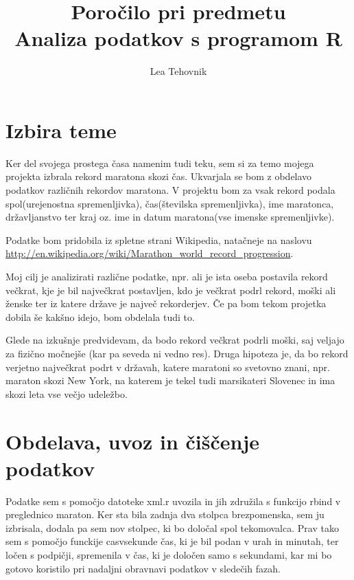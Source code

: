 \documentclass[11pt,a4paper]{article}
\begin{document}
\title{Poročilo pri predmetu \\
Analiza podatkov s programom R}
\author{Lea Tehovnik}
\maketitle

\section{Izbira teme}

Ker del svojega prostega časa namenim tudi teku, sem si za temo mojega projekta izbrala rekord maratona skozi čas.  Ukvarjala se bom z obdelavo podatkov različnih rekordov maratona. V projektu bom za vsak rekord podala spol(urejenostna spremenljivka), čas(številska spremenljivka), ime maratonca, državljanstvo ter kraj oz. ime in datum maratona(vse imenske spremenljivke). 

Podatke bom pridobila iz spletne strani Wikipedia, natačneje na naslovu \url{http://en.wikipedia.org/wiki/Marathon_world_record_progression}.

Moj cilj je analizirati različne podatke, npr. ali je ista oseba postavila rekord večkrat, kje je bil največkrat postavljen, kdo je večkrat podrl rekord, moški ali ženske ter iz katere države je največ rekorderjev. Če pa bom tekom projetka dobila še kakšno idejo, bom obdelala tudi to.

Glede na izkušnje predvidevam, da bodo rekord večkrat podrli moški, saj veljajo za fizično močnejše (kar pa seveda ni vedno res). Druga hipoteza je, da bo rekord verjetno največkrat podrt v državah, katere maratoni so svetovno znani, npr. maraton skozi New York, na katerem je tekel tudi marsikateri Slovenec in ima skozi leta vse večjo udeležbo.

\section{Obdelava, uvoz in čiščenje podatkov}

Podatke sem s pomočjo datoteke xml.r uvozila in jih združila s funkcijo rbind v preglednico maraton. Ker sta bila zadnja dva stolpca brezpomenska, sem ju izbrisala, dodala pa sem nov stolpec, ki bo določal spol tekomovalca. Prav tako sem s pomočjo funckije casvsekunde čas, ki je bil podan v urah in minutah, ter ločen s podpičji, spremenila v čas, ki je določen samo s sekundami, kar mi bo gotovo koristilo pri nadaljni obravnavi podatkov v sledečih fazah.
\end{document}
